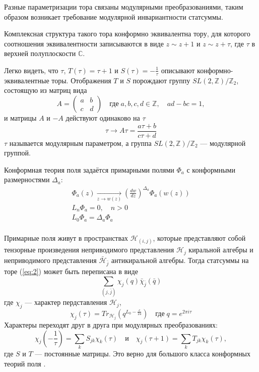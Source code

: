 \documentclass[a4paper,12pt]{article}
\theoremstyle{definition} \newtheorem{Def}{Definition}
\begin{document}
Разные параметризации тора связаны модулярными преобразованиями, таким образом возникает требование модулярной инвариантности статсуммы.

Комплексная структура такого тора конформно эквивалентна тору, для которого соотношения эквивалентности записываются в виде $z\sim z+1$ и $z\sim z+\tau$, где $\tau$ в верхней полуплоскости $\mathbb{C}$.

Легко видеть, что $\tau$, $T(\tau)=\tau+1$ и $S(\tau)=-\frac{1}{\tau}$ описывают конформно-эквивалентные торы. Отображения $T$ и $S$ порождают группу  $SL(2,\mathbb{Z})/\mathbb{Z}_2$, состоящую из матриц вида
\begin{equation}
  \label{eq:99}
  A=
  \begin{pmatrix}
    a & b\\
    c & d 
  \end{pmatrix}
  \quad\mbox{где}\; a,b,c,d\in\mathbb{Z},\quad ad-bc=1,
\end{equation}
и матрицы $A$ и $-A$ действуют одинаково на $\tau$
\begin{equation}
  \label{eq:100}
  \tau\to A\tau=\frac{a\tau+b}{c\tau+d}
\end{equation}
 $\tau$ называется модулярным параметром, а группа $SL(2,\mathbb{Z})/\mathbb{Z}_2$ --- модулярной группой.

Конформная теория поля задаётся примарными полями $\Phi_a$ с конформными размерностями $\Delta_a$:
\begin{equation}
  \label{eq:3}
  \begin{split}
    \Phi_{a}(z)\underset{z\to w(z)}{\longrightarrow} \left(\frac{dw}{dz}\right)^{\Delta_a}\Phi_{a}(w(z))\\
    L_n \Phi_a=0,\quad n>0\\
    L_0 \Phi_a=\Delta_a \Phi_a\\
  \end{split}
\end{equation}

Примарные поля живут в пространствах $\mathcal{H}_{(i,j)}$, которые представляют собой тензорные произведения неприводимого представления  $\mathcal{H}_j$ киральной алгебры и неприводимого представления $\bar{\mathcal{H}}_{\bar{j}}$ антикиральной алгебры. Тогда статсуммы на торе (\ref{eq:2}) может быть переписана в виде  
\begin{equation}
  \label{eq:4}
  \sum_{(j,\bar j)}\chi_j(q)\bar \chi_{\bar j}(\bar q)
\end{equation}
где $\chi_j$ --- характер пердставления $\mathcal{H}_j$,
\begin{equation}
  \label{eq:5}
  \chi_j(\tau)=Tr_{\mathcal{H}_j}(q^{L_0-\frac{c}{24}})\quad \mbox{где}\; q=e^{2\pi i \tau}
\end{equation}
Характеры переходят друг в друга при модулярных преобразованиях:
\begin{equation}
  \label{eq:107}
  \chi_j\left(-\frac{1}{\tau}\right)=\sum_k S_{jk}\chi_k(\tau)\quad \mbox{и}\quad \chi_j(\tau+1)=\sum_kT_{jk}\chi_k(\tau),
\end{equation}
где $S$ и $T$ --- постоянные матрицы. Это верно для большого класса конформных теорий поля \cite{gaberdiel2000icf}. 
\end{document}
